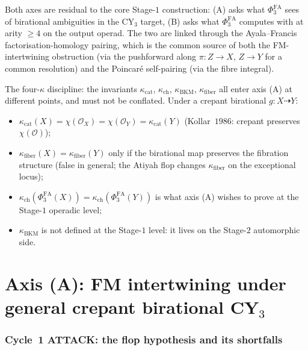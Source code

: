 \documentclass[11pt]{article}
\theoremstyle{definition}
\theoremstyle{remark}
\providecommand{\PhiFA}{\Phi^{\mathrm{FA}}}
\providecommand{\cO}{\mathcal{O}}
\begin{document}
Both axes are residual to the core Stage-$1$ construction: (A) asks
what $\PhiFA_3$ sees of birational ambiguities in the CY$_3$ target,
(B) asks what $\PhiFA_3$ computes with at arity $\geq 4$ on the output
operad. The two are linked through the Ayala--Francis factorisation-homology
pairing, which is the common source of both the FM-intertwining
obstruction (via the pushforward along $\pi \colon Z \to X$, $Z \to Y$
for a common resolution) and the Poincar\'e self-pairing (via the
fibre integral).

The four-$\kappa$ discipline: the invariants $\kappa_{\mathrm{cat}}$,
$\kappa_{\mathrm{ch}}$, $\kappa_{\mathrm{BKM}}$, $\kappa_{\mathrm{fiber}}$
all enter axis (A) at different points, and must not be conflated.
Under a crepant birational $g \colon X \dashrightarrow Y$:
\begin{itemize}
 \item $\kappa_{\mathrm{cat}}(X) = \chi(\cO_X) = \chi(\cO_Y) = \kappa_{\mathrm{cat}}(Y)$
  (Kollar~$1986$: crepant preserves $\chi(\cO)$);
 \item $\kappa_{\mathrm{fiber}}(X) = \kappa_{\mathrm{fiber}}(Y)$ only if the
  birational map preserves the fibration structure (false in general;
  the Atiyah flop changes $\kappa_{\mathrm{fiber}}$ on the exceptional locus);
 \item $\kappa_{\mathrm{ch}}(\PhiFA_3(X)) = \kappa_{\mathrm{ch}}(\PhiFA_3(Y))$
  is what axis (A) wishes to prove at the Stage-$1$ operadic level;
 \item $\kappa_{\mathrm{BKM}}$ is not defined at the Stage-$1$ level: it
  lives on the Stage-$2$ automorphic side.
\end{itemize}

\part*{Axis (A): FM intertwining under general crepant birational CY$_3$}

\section{Cycle~1 ATTACK: the flop hypothesis and its shortfalls}
\end{document}
